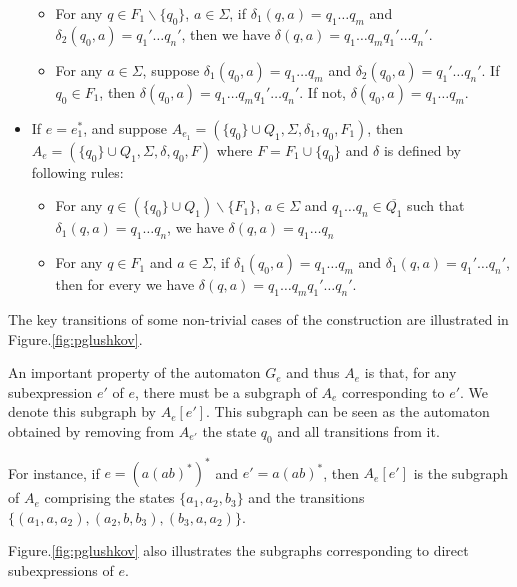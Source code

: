 \begin{itemize}
\begin{itemize}
    \item For any $q \in F_1 \backslash \{ q_0 \}$, $a \in \Sigma$, if
    $\delta_1 (q, a) = q_1 \ldots q_m$ and $\delta_2 (q_0, a) = q_1' \ldots
    q_n'$, then we have $\delta (q, a) = q_1 \ldots q_m q_1' \ldots q_n'$.
    
    \item For any $a \in \Sigma$, suppose $\delta_1 (q_0, a) = q_1 \ldots q_m$
    and $\delta_2 (q_0, a) = q_1' \ldots q_n'$. If $q_0 \in F_1$, then $\delta
    (q_0, a) = q_1 \ldots q_m q_1' \ldots q_n'$. If not, $\delta (q_0, a) =
    q_1 \ldots q_m$.
  \end{itemize}
  \item If $e = e_1^{\ast}$, and suppose $A_{e_1} = (\{ q_0 \} \cup Q_1,
  \Sigma, \delta_1, q_0, F_1)$, then $A_e = (\{ q_0 \} \cup Q_1, \Sigma,
  \delta, q_0, F)$ where $F = F_1 \cup \{ q_0 \}$ and $\delta$ is defined by
  following rules:
  \begin{itemize}
    \item For any $q \in (\{ q_0 \} \cup Q_1) \backslash \{ F_1 \}$, $a \in
    \Sigma$ and $q_1 \ldots q_n \in \overline{Q_1}$ such that $\delta_1 (q, a)
    = q_1 \ldots q_n$, we have $\delta (q, a) = q_1 \ldots q_n$
    
    \item For any $q \in F_1$ and $a \in \Sigma$, if $\delta_1 (q_0, a) = q_1
    \ldots q_m$ and $\delta_1 (q, a) = q_1' \ldots q_n'$, then for every we
    have $\delta (q, a) = q_1 \ldots q_m q_1' \ldots q_n'$.
  \end{itemize}
\end{itemize}

The key transitions of some non-trivial cases of the construction are illustrated in Figure.\ref{fig:pglushkov}.

 An important property of the automaton $G_e$ and thus $A_e$ is that, for any subexpression $e'$ of $e$, there must be a subgraph of $A_{e}$ corresponding to $e'$. We denote this subgraph by $A_{e}[e']$. This subgraph can be seen as the automaton obtained by removing from $A_{e'}$ the state $q_0$ and all transitions from it.
 
 For instance, if $e = (a (ab)^*)^*$ and $e' = a(ab)^*$, then $A_{e}[e']$ is the subgraph of $A_{e}$ comprising the states $\{a_1, a_2, b_3\}$ and the transitions $\{(a_1, a, a_2), (a_2, b, b_3), (b_3, a, a_2)\}$.
 
 Figure.\ref{fig:pglushkov} also illustrates the subgraphs corresponding to direct subexpressions of $e$.
 


